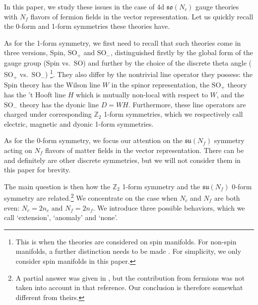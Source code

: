 \documentclass[12pt]{article}
\numberwithin{equation}{section}
\def\bZ{\mathbb{Z}}
\def\SO{\mathrm{SO}}
\def\su{\mathfrak{su}}
\def\so{\mathfrak{so}}
\def\Spin{\mathrm{Spin}}
\begin{document}
In this paper, we study these issues in the case of 4d $\so(N_c)$ gauge theories with 
$N_f$ flavors of fermion fields in the vector representation.
Let us quickly recall the 0-form and 1-form symmetries these theories have.

As for the 1-form symmetry, we first need to recall that 
such theories come in three versions, $\Spin$, $\SO_+$ and $\SO_-$,
distinguished firstly by the global form of the gauge group ($\Spin$ vs.~$\SO$)
and further by the choice of the discrete theta angle ($\SO_+$ vs.~$\SO_-$) \cite{Aharony:2013hda}\footnote{%
This is when the theories are considered on spin manifolds.
For non-spin manifolds, a further distinction needs to be made \cite{Ang:2019txy}.
For simplicity, we only consider spin manifolds in this paper.
}.
They also differ by the nontrivial line operator they possess: 
the $\Spin$ theory has the Wilson line $W$ in the spinor representation,
the $\SO_+$ theory has the 't Hooft line $H$ which is mutually non-local with respect to $W$,
and the $\SO_-$ theory has the dyonic line $D=WH$. 
Furthermore, these line operators are charged under corresponding $\bZ_2$ 1-form symmetries,
which we respectively call electric, magnetic and dyonic 1-form symmetries.

As for the 0-form symmetry, 
we focus our attention on the $\su(N_f)$ symmetry acting on $N_f$ flavors of matter fields 
in the vector representation.
There can be and definitely are other discrete symmetries, but we will not consider them in this paper for brevity.

The main question is then how the $\bZ_2$ 1-form symmetry and the $\su(N_f)$ 0-form symmetry are related.\footnote{%
A partial answer was given in \cite{Hsin:2020nts}, but the contribution from fermions was not taken into account in that reference.
Our conclusion is therefore somewhat different from theirs.
}
We concentrate on the case when $N_c$ and $N_f$ are both even: $N_c=2n_c$ and $N_f=2n_f$.
We introduce three possible behaviors, which we call `extension', `anomaly' and `none'.
\end{document}
